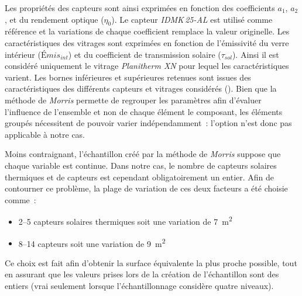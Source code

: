 Les propriétés des capteurs sont ainsi exprimées en fonction des coefficients $a_{1}$,
$a_{2}$, et du rendement optique ($\eta_{0}$). Le capteur \textit{IDMK\,25-AL} est
utilisé comme référence et la variations de chaque coefficient remplace la valeur originelle.
Les caractéristiques des vitrages sont exprimées en fonction de l’émissivité
du verre intérieur ($Émis_{int}$) et du coefficient de transmission solaire ($\tau_{sol}$).
Ainsi il est considéré uniquement le vitrage \textit{Planitherm XN} pour lequel les
caractéristiques varient. Les bornes inférieures et supérieures retenues sont issues des caractéristiques
des différents capteurs et vitrages considérés ().
Bien que la méthode de \textit{Morris} permette de regrouper les paramètres afin d’évaluer
l’influence de l’ensemble et non de chaque élément le composant, les éléments groupés
nécessitent de pouvoir varier indépendamment~: l’option n’est donc pas applicable à notre cas.


Moins contraignant, l’échantillon créé par la méthode de \textit{Morris} suppose que
chaque variable est continue. Dans notre cas, le nombre de capteurs solaires thermiques
et de capteurs  est cependant obligatoirement un entier. Afin de contourner
ce problème, la plage de variation de ces deux facteurs a été choisie comme~:
\begin{itemize}
  \item \SIrange{2}{5}{} capteurs solaires thermiques soit une variation de \SI{7}{\metre\squared}
  \item \SIrange{8}{14}{} capteurs  soit une variation de \SI{9}{\metre\squared}
\end{itemize}
Ce choix est fait afin d’obtenir la surface équivalente la plus proche possible, tout
en assurant que les valeurs prises lors de la création de l’échantillon sont des entiers
(vrai seulement lorsque l’échantillonnage considère quatre niveaux).


